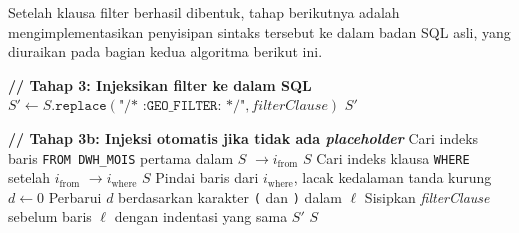 Setelah klausa filter berhasil dibentuk, tahap berikutnya adalah mengimplementasikan penyisipan sintaks tersebut ke dalam badan SQL asli, yang diuraikan pada bagian kedua algoritma berikut ini.

\begin{algorithm}[htbp]
\caption{Injeksi Filter Geografis ke dalam Kueri SQL (Bagian 2)}
\label{alg:geo-filter-2}
\begin{algorithmic}[1]
\State \textbf{// Tahap 3: Injeksikan filter ke dalam SQL}
    \State $S' \gets S.\texttt{replace}(\texttt{"/* :GEO\_FILTER: */"}, \textit{filterClause})$
    \State \Return $S'$
\EndIf

\State \textbf{// Tahap 3b: Injeksi otomatis jika tidak ada \textit{placeholder}}
\State Cari indeks baris \texttt{FROM DWH\_MOIS} pertama dalam $S$ $\to i_{\text{from}}$
    \State \Return $S$
\EndIf
\State Cari indeks klausa \texttt{WHERE} setelah $i_{\text{from}}$ $\to i_{\text{where}}$
    \State \Return $S$
\EndIf
\State Pindai baris dari $i_{\text{where}}$, lacak kedalaman tanda kurung $d \gets 0$
    \State Perbarui $d$ berdasarkan karakter \texttt{(} dan \texttt{)} dalam $\ell$
        \State Sisipkan \textit{filterClause} sebelum baris $\ell$ dengan indentasi yang sama
        \State \Return $S'$
    \EndIf
\EndFor
\State \Return $S$

\end{algorithmic}
\end{algorithm}
